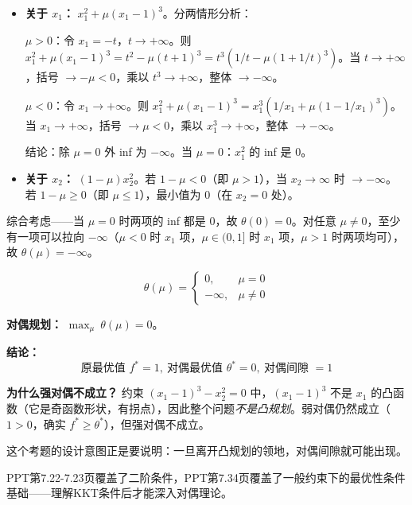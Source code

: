 {\begin{itemize}
  \item \textbf{关于 $x_1$：} $x_1^2 + \mu(x_1-1)^3$。分两情形分析：

  $\mu>0$：令 $x_1=-t$，$t\to+\infty$。则 $x_1^2+\mu(x_1-1)^3 = t^2-\mu(t+1)^3 = t^3(1/t - \mu(1+1/t)^3)$。当 $t\to+\infty$，括号 $\to -\mu<0$，乘以 $t^3\to+\infty$，整体 $\to -\infty$。

  $\mu<0$：令 $x_1\to+\infty$。则 $x_1^2+\mu(x_1-1)^3 = x_1^3(1/x_1 + \mu(1-1/x_1)^3)$。当 $x_1\to+\infty$，括号 $\to \mu<0$，乘以 $x_1^3\to+\infty$，整体 $\to -\infty$。

  结论：除 $\mu=0$ 外 inf 为 $-\infty$。当 $\mu=0$：$x_1^2$ 的 inf 是 0。

  \item \textbf{关于 $x_2$：} $(1-\mu)x_2^2$。若 $1-\mu < 0$（即 $\mu > 1$），当 $x_2 \to \infty$ 时 $\to -\infty$。若 $1-\mu \ge 0$（即 $\mu \le 1$），最小值为 0（在 $x_2=0$ 处）。
\end{itemize}

综合考虑——当 $\mu = 0$ 时两项的 inf 都是 0，故 $\theta(0) = 0$。对任意 $\mu \neq 0$，至少有一项可以拉向 $-\infty$（$\mu<0$ 时 $x_1$ 项，$\mu \in (0,1]$ 时 $x_1$ 项，$\mu>1$ 时两项均可），故 $\theta(\mu) = -\infty$。

\[
\theta(\mu) = \begin{cases}
0, & \mu = 0 \\
-\infty, & \mu \neq 0
\end{cases}
\]

\textbf{对偶规划：} $\displaystyle\max_{\mu}\ \theta(\mu) = 0$。

\textbf{结论：}
\[
\text{原最优值 } f^* = 1,\ \text{对偶最优值 } \theta^* = 0,\ \text{对偶间隙 } = 1
\]

\begin{notebox}
\textbf{为什么强对偶不成立？} 约束 $(x_1-1)^3 - x_2^2 = 0$ 中，$(x_1-1)^3$ 不是 $x_1$ 的凸函数（它是奇函数形状，有拐点），因此整个问题\emph{不是凸规划}。弱对偶仍然成立（$1 > 0$，确实 $f^* \ge \theta^*$），但强对偶不成立。

这个考题的设计意图正是要说明：一旦离开凸规划的领地，对偶间隙就可能出现。
\end{notebox}

\medskip
PPT第7.22-7.23页覆盖了二阶条件，PPT第7.34页覆盖了一般约束下的最优性条件基础——理解KKT条件后才能深入对偶理论。

\medskip
{}
\medskip
{}
\medskip}

